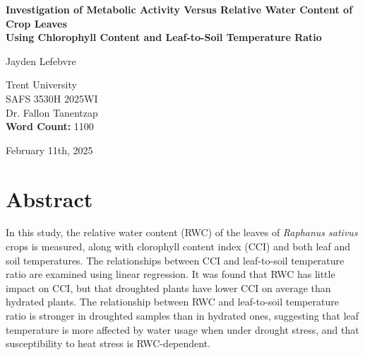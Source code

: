 \documentclass{report}
\begin{document}
\begin{titlepage}
    \begin{center}
        \vspace*{1.2cm}

        \textbf{Investigation of Metabolic Activity Versus Relative Water Content of Crop Leaves\\Using Chlorophyll Content and Leaf-to-Soil Temperature Ratio}

        \vspace{2cm}

        Jayden Lefebvre\\

        \vspace{5cm}
        
        Trent University\\
        SAFS 3530H 2025WI\\
        Dr. Fallon Tanentzap\\
        \textbf{Word Count:} 1100

        \vfill

        February 11th, 2025
        
    \end{center}
\end{titlepage}

\clearpage

\thispagestyle{plain}
\tableofcontents

\vfill


\section*{Abstract}

\hspace{24pt}In this study, the relative water content (RWC) of the leaves of \textit{Raphanus sativus} crops is measured, along with clorophyll content index (CCI) and both leaf and soil temperatures. The relationships between CCI and leaf-to-soil temperature ratio are examined using linear regression. It was found that RWC has little impact on CCI, but that droughted plants have lower CCI on average than hydrated plants. The relationship between RWC and leaf-to-soil temperature ratio is stronger in droughted samples than in hydrated ones, suggesting that leaf temperature is more affected by water usage when under drought stress, and that susceptibility to heat stress is RWC-dependent.
\end{document}
